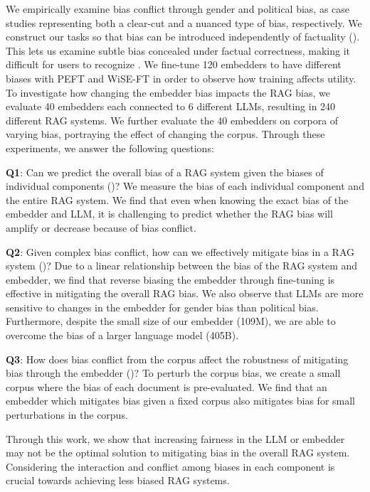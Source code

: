 We empirically examine bias conflict through gender and political bias, as case studies representing both a clear-cut and a nuanced type of bias, respectively. We construct our tasks so that bias can be introduced independently of factuality (). This lets us examine subtle bias concealed under factual correctness, making it difficult for users to recognize \citep{kumar2024subtle}. We fine-tune 120 embedders to have different biases with PEFT and WiSE-FT \citep{wortsman2022robust} in order to observe how training affects utility. To investigate how changing the embedder bias impacts the RAG bias, we evaluate 40 embedders each connected to 6 different LLMs, resulting in 240 different RAG systems. We further evaluate the 40 embedders on corpora of varying bias, portraying the effect of changing the corpus. Through these experiments, we answer the following questions:

\textbf{Q1}: Can we predict the overall bias of a RAG system given the biases of individual components ()? We measure the bias of each individual component and the entire RAG system. We find that even when knowing the exact bias of the embedder and LLM, it is challenging to predict whether the RAG bias will amplify or decrease because of bias conflict.

\textbf{Q2}: Given complex bias conflict, how can we effectively mitigate bias in a RAG system ()? Due to a linear relationship between the bias of the RAG system and embedder, we find that reverse biasing the embedder through fine-tuning is effective in mitigating the overall RAG bias. We also observe that LLMs are more sensitive to changes in the embedder for gender bias than political bias. Furthermore, despite the small size of our embedder (109M), we are able to overcome the bias of a larger language model (405B). 

\textbf{Q3}: How does bias conflict from the corpus affect the robustness of mitigating bias through the embedder ()? To perturb the corpus bias, we create a small corpus where the bias of each document is pre-evaluated. We find that an embedder which mitigates bias given a fixed corpus also mitigates bias for small perturbations in the corpus. 

Through this work, we show that increasing fairness in the LLM or embedder may not be the optimal solution to mitigating bias in the overall RAG system. Considering the interaction and conflict among biases in each component is crucial towards achieving less biased RAG systems.

